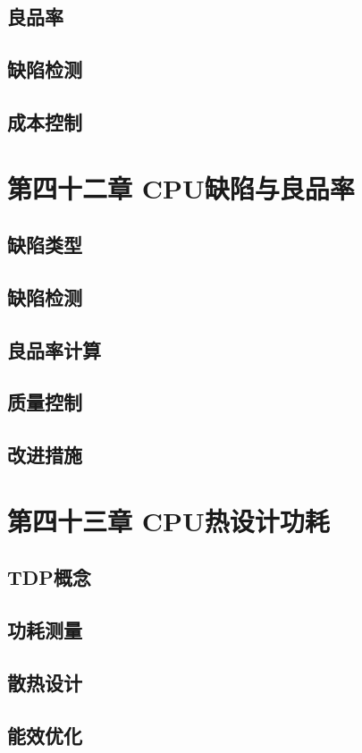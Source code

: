 \documentclass[12pt,UTF8]{ctexbook}
\begin{document}
\section{良品率}
\section{缺陷检测}
\section{成本控制}

\chapter{第四十二章 CPU缺陷与良品率}

\section{缺陷类型}
\section{缺陷检测}
\section{良品率计算}
\section{质量控制}
\section{改进措施}

\chapter{第四十三章 CPU热设计功耗}

\section{TDP概念}
\section{功耗测量}
\section{散热设计}
\section{能效优化}
\end{document}
